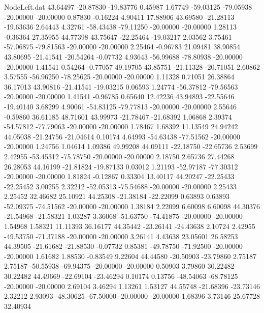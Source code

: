 \begin{filecontents}{NodeLeft.dat}
  43.64497  -20.87830  -19.83776     0.45987    1.67749  -59.03125  -79.05938  -20.00000  -20.00000    0.87830   -0.16224    4.90411   17.88906
  43.69580  -21.28113  -19.63636     2.64443    4.32761  -58.43438  -79.11250  -20.00000  -20.00000    1.28113   -0.36364   27.35955   44.77398
  43.75647  -22.25464  -19.03217     2.03562    3.75461  -57.06875  -79.81563  -20.00000  -20.00000    2.25464   -0.96783   21.09481   38.90854
  43.80695  -21.41541  -20.54264    -0.07732    4.93643  -56.99688  -78.80938  -20.00000  -20.00000    1.41541    0.54264   -0.77057   49.19705
  43.85751  -21.11328  -20.71051     2.60862    3.57555  -56.96250  -78.25625  -20.00000  -20.00000    1.11328    0.71051   26.38864   36.17013
  43.90816  -21.41541  -19.03215     0.06593    1.24774  -56.37812  -79.56563  -20.00000  -20.00000    1.41541   -0.96785    0.65640   12.42236
  43.94893  -22.55646  -19.40140     3.68299    4.90061  -54.83125  -79.77813  -20.00000  -20.00000    2.55646   -0.59860   36.61185   48.71601
  43.99973  -21.78467  -21.68392     1.06868    2.39374  -54.57812  -77.79063  -20.00000  -20.00000    1.78467    1.68392   11.13549   24.94242
  44.05038  -21.24756  -21.04614     0.10174    4.64993  -54.63438  -77.51562  -20.00000  -20.00000    1.24756    1.04614    1.09386   49.99208
  44.09111  -22.18750  -22.65736     2.53699    2.42955  -53.45312  -75.78750  -20.00000  -20.00000    2.18750    2.65736   27.44268   26.28053
  44.16199  -21.81824  -19.87133     0.03012    1.21193  -52.97187  -77.30312  -20.00000  -20.00000    1.81824   -0.12867    0.33304   13.40117
  44.20247  -22.25433  -22.25452     3.00255    2.32212  -52.05313  -75.54688  -20.00000  -20.00000    2.25433    2.25452   32.46682   25.10921
  44.25308  -21.38184  -22.22099     0.63893    0.63893  -52.09375  -74.51562  -20.00000  -20.00000    1.38184    2.22099    6.60098    6.60098
  44.30376  -21.54968  -21.58321     1.03287    3.36068  -51.63750  -74.41875  -20.00000  -20.00000    1.54968    1.58321   11.11393   36.16177
  44.35442  -23.26141  -24.43638     2.10724    2.42955  -49.53750  -71.37188  -20.00000  -20.00000    3.26141    4.43638   23.05601   26.58253
  44.39505  -21.61682  -21.88530    -0.07732    0.85381  -49.78750  -71.92500  -20.00000  -20.00000    1.61682    1.88530   -0.83549    9.22604
  44.44580  -20.50903  -23.79860     2.75187    2.75187  -50.55938  -69.94375  -20.00000  -20.00000    0.50903    3.79860   30.22482   30.22482
  44.49669  -22.69104  -23.46294     0.10174    0.13756  -48.54063  -68.78125  -20.00000  -20.00000    2.69104    3.46294    1.13261    1.53127
  44.55748  -21.68396  -23.73146     2.32212    2.93093  -48.30625  -67.50000  -20.00000  -20.00000    1.68396    3.73146   25.67728   32.40934

\end{filecontents}
